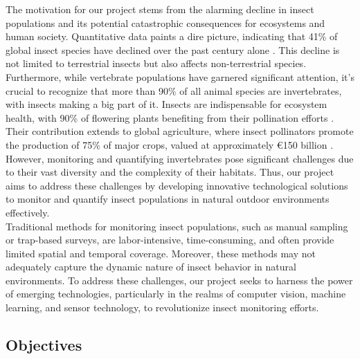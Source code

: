\documentclass[sigchi,screen]{acmart}
\begin{document}
The motivation for our project stems from the alarming decline in insect populations and its potential catastrophic consequences for ecosystems and human society. Quantitative data paints a dire picture, indicating that 41\% of global insect species have declined over the past century alone \citep{sanchez2019worldwide}. This decline is not limited to terrestrial insects but also affects non-terrestrial species. Furthermore, while vertebrate populations have garnered significant attention, it's crucial to recognize that more than 90\% of all animal species are invertebrates, with insects making a big part of it. Insects are indispensable for ecosystem health, with 90\% of flowering plants benefiting from their pollination efforts \citep{ollerton2011many}. Their contribution extends to global agriculture, where insect pollinators promote the production of 75\% of major crops, valued at approximately €150 billion \citep{gallai2009economic, eilers2011contribution}. However, monitoring and quantifying invertebrates pose significant challenges due to their vast diversity and the complexity of their habitats. Thus, our project aims to address these challenges by developing innovative technological solutions to monitor and quantify insect populations in natural outdoor environments effectively.\\
Traditional methods for monitoring insect populations, such as manual sampling or trap-based surveys, are labor-intensive, time-consuming, and often provide limited spatial and temporal coverage. Moreover, these methods may not adequately capture the dynamic nature of insect behavior in natural environments. To address these challenges, our project seeks to harness the power of emerging technologies, particularly in the realms of computer vision, machine learning, and sensor technology, to revolutionize insect monitoring efforts.

\subsection{Objectives}
\end{document}
